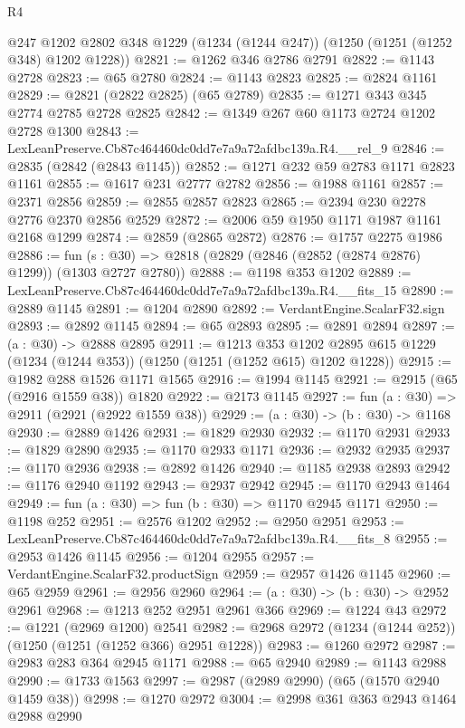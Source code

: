 \begin{lexlean}{R4}
\begin{coremodule}
    @247
    @1202
    @2802
    @348
    @1229
    (@1234 (@1244 @247))
    (@1250 (@1251 (@1252 @348) @1202 @1228))
@2821 := @1262 @346 @2786 @2791
@2822 := @1143 @2728
@2823 := @65 @2780
@2824 := @1143 @2823
@2825 := @2824 @1161
@2829 := @2821 (@2822 @2825) (@65 @2789)
@2835 := @1271 @343 @345 @2774 @2785 @2728 @2825
@2842 := @1349 @267 @60 @1173 @2724 @1202 @2728 @1300
@2843 := LexLeanPreserve.Cb87c464460dc0dd7e7a9a72afdbc139a.R4.__rel_9
@2846 := @2835 (@2842 (@2843 @1145))
@2852 := @1271 @232 @59 @2783 @1171 @2823 @1161
@2855 := @1617 @231 @2777 @2782
@2856 := @1988 @1161
@2857 := @2371 @2856
@2859 := @2855 @2857 @2823
@2865 := @2394 @230 @2278 @2776 @2370 @2856 @2529
@2872 := @2006 @59 @1950 @1171 @1987 @1161 @2168 @1299
@2874 := @2859 (@2865 @2872)
@2876 := @1757 @2275 @1986
@2886 := fun (s : @30) => @2818 (@2829 (@2846 (@2852 (@2874 @2876) @1299)) (@1303 @2727 @2780))
@2888 := @1198 @353 @1202
@2889 := LexLeanPreserve.Cb87c464460dc0dd7e7a9a72afdbc139a.R4.__fits_15
@2890 := @2889 @1145
@2891 := @1204 @2890
@2892 := VerdantEngine.ScalarF32.sign
@2893 := @2892 @1145
@2894 := @65 @2893
@2895 := @2891 @2894
@2897 := (a : @30) -> @2888 @2895
@2911 := @1213
    @353
    @1202
    @2895
    @615
    @1229
    (@1234 (@1244 @353))
    (@1250 (@1251 (@1252 @615) @1202 @1228))
@2915 := @1982 @288 @1526 @1171 @1565
@2916 := @1994 @1145
@2921 := @2915 (@65 (@2916 @1559 @38)) @1820
@2922 := @2173 @1145
@2927 := fun (a : @30) => @2911 (@2921 (@2922 @1559 @38))
@2929 := (a : @30) -> (b : @30) -> @1168
@2930 := @2889 @1426
@2931 := @1829 @2930
@2932 := @1170 @2931
@2933 := @1829 @2890
@2935 := @1170 @2933 @1171
@2936 := @2932 @2935
@2937 := @1170 @2936
@2938 := @2892 @1426
@2940 := @1185 @2938 @2893
@2942 := @1176 @2940 @1192
@2943 := @2937 @2942
@2945 := @1170 @2943 @1464
@2949 := fun (a : @30) => fun (b : @30) => @1170 @2945 @1171
@2950 := @1198 @252
@2951 := @2576 @1202
@2952 := @2950 @2951
@2953 := LexLeanPreserve.Cb87c464460dc0dd7e7a9a72afdbc139a.R4.__fits_8
@2955 := @2953 @1426 @1145
@2956 := @1204 @2955
@2957 := VerdantEngine.ScalarF32.productSign
@2959 := @2957 @1426 @1145
@2960 := @65 @2959
@2961 := @2956 @2960
@2964 := (a : @30) -> (b : @30) -> @2952 @2961
@2968 := @1213 @252 @2951 @2961 @366
@2969 := @1224 @43
@2972 := @1221 (@2969 @1200) @2541
@2982 := @2968 @2972 (@1234 (@1244 @252)) (@1250 (@1251 (@1252 @366) @2951 @1228))
@2983 := @1260 @2972
@2987 := @2983 @283 @364 @2945 @1171
@2988 := @65 @2940
@2989 := @1143 @2988
@2990 := @1733 @1563
@2997 := @2987 (@2989 @2990) (@65 (@1570 @2940 @1459 @38))
@2998 := @1270 @2972
@3004 := @2998 @361 @363 @2943 @1464 @2988 @2990

\end{coremodule}
\end{lexlean}
